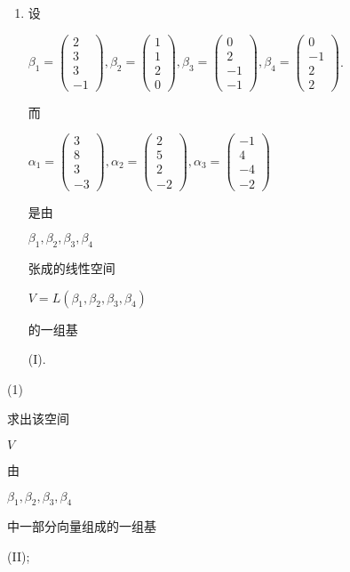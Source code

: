 \documentclass[10pt]{article}
\begin{document}
\begin{enumerate}
  \item \begin{CJK}{UTF8}{mj}设\end{CJK} $\beta_{1}=\left(\begin{array}{c}2 \\ 3 \\ 3 \\ -1\end{array}\right), \beta_{2}=\left(\begin{array}{l}1 \\ 1 \\ 2 \\ 0\end{array}\right), \beta_{3}=\left(\begin{array}{c}0 \\ 2 \\ -1 \\ -1\end{array}\right), \beta_{4}=\left(\begin{array}{c}0 \\ -1 \\ 2 \\ 2\end{array}\right)$. \begin{CJK}{UTF8}{mj}而\end{CJK} $\alpha_{1}=\left(\begin{array}{c}3 \\ 8 \\ 3 \\ -3\end{array}\right), \alpha_{2}=\left(\begin{array}{c}2 \\ 5 \\ 2 \\ -2\end{array}\right), \alpha_{3}=\left(\begin{array}{c}-1 \\ 4 \\ -4 \\ -2\end{array}\right)$ \begin{CJK}{UTF8}{mj}是由\end{CJK} $\beta_{1}, \beta_{2}, \beta_{3}, \beta_{4}$ \begin{CJK}{UTF8}{mj}张成的线性空间\end{CJK} $V=L\left(\beta_{1}, \beta_{2}, \beta_{3}, \beta_{4}\right)$ \begin{CJK}{UTF8}{mj}的一组基\end{CJK} (I).

\end{enumerate}
(1) \begin{CJK}{UTF8}{mj}求出该空间\end{CJK} $V$ \begin{CJK}{UTF8}{mj}由\end{CJK} $\beta_{1}, \beta_{2}, \beta_{3}, \beta_{4}$ \begin{CJK}{UTF8}{mj}中一部分向量组成的一组基\end{CJK} (II);
\end{document}
